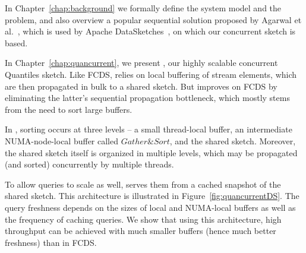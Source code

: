 In Chapter~\ref{chap:background} we formally define the system model and the problem, and also overview a popular sequential solution proposed by Agarwal et al.~\cite{mergeables_summaries}, which is used by Apache DataSketches~\cite{DataSketches}, on which our concurrent sketch is based.


In Chapter~\ref{chap:quancurrent}, we present \mysketch, our highly scalable concurrent Quantiles sketch.
Like FCDS, \mysketch relies on local buffering of stream elements, which are then propagated in bulk to a shared sketch.
But \mysketch improves on FCDS by eliminating the latter's sequential propagation bottleneck, which mostly stems from the need to sort large buffers.

In \mysketch, sorting occurs at three levels -- a small thread-local buffer, an intermediate \acrshort{NUMA}-node-local buffer called $\mathit{Gather\&Sort}$, and the shared sketch.
Moreover, the shared sketch itself is organized in multiple levels, which may be propagated (and sorted) concurrently by multiple threads.

To allow queries to scale as well, \mysketch serves them from a cached snapshot of the shared sketch.
This architecture is illustrated in Figure~\ref{fig:quancurrentDS}.
The query freshness depends on the sizes of local and NUMA-local buffers as well as the frequency of caching queries.
We show that using this architecture, high throughput can be achieved with much smaller buffers (hence much better freshness) than in FCDS.



